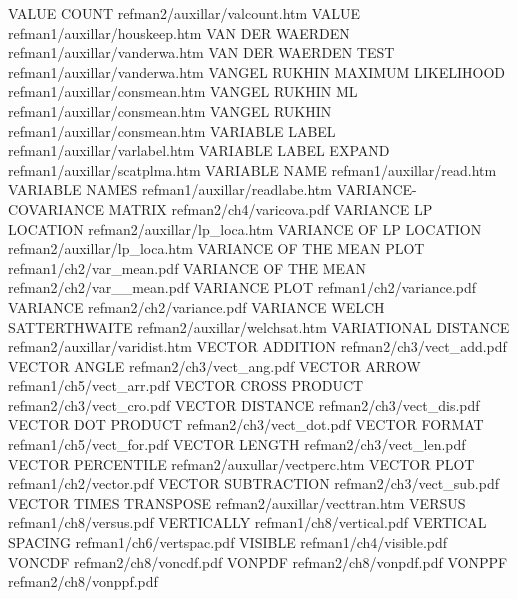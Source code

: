 VALUE COUNT                             refman2/auxillar/valcount.htm
VALUE                                   refman1/auxillar/houskeep.htm
VAN DER WAERDEN                         refman1/auxillar/vanderwa.htm
VAN DER WAERDEN TEST                    refman1/auxillar/vanderwa.htm
VANGEL RUKHIN MAXIMUM LIKELIHOOD        refman1/auxillar/consmean.htm
VANGEL RUKHIN ML                        refman1/auxillar/consmean.htm
VANGEL RUKHIN                           refman1/auxillar/consmean.htm
VARIABLE LABEL                          refman1/auxillar/varlabel.htm
VARIABLE LABEL EXPAND                   refman1/auxillar/scatplma.htm
VARIABLE NAME                           refman1/auxillar/read.htm
VARIABLE NAMES                          refman1/auxillar/readlabe.htm
VARIANCE-COVARIANCE MATRIX              refman2/ch4/varicova.pdf
VARIANCE LP LOCATION                    refman2/auxillar/lp_loca.htm
VARIANCE OF LP LOCATION                 refman2/auxillar/lp_loca.htm
VARIANCE OF THE MEAN PLOT               refman1/ch2/var_mean.pdf
VARIANCE OF THE MEAN                    refman2/ch2/var__mean.pdf
VARIANCE PLOT                           refman1/ch2/variance.pdf
VARIANCE                                refman2/ch2/variance.pdf
VARIANCE WELCH SATTERTHWAITE            refman2/auxillar/welchsat.htm
VARIATIONAL DISTANCE                    refman2/auxillar/varidist.htm
VECTOR ADDITION                         refman2/ch3/vect_add.pdf
VECTOR ANGLE                            refman2/ch3/vect_ang.pdf
VECTOR ARROW                            refman1/ch5/vect_arr.pdf
VECTOR CROSS PRODUCT                    refman2/ch3/vect_cro.pdf
VECTOR DISTANCE                         refman2/ch3/vect_dis.pdf
VECTOR DOT PRODUCT                      refman2/ch3/vect_dot.pdf
VECTOR FORMAT                           refman1/ch5/vect_for.pdf
VECTOR LENGTH                           refman2/ch3/vect_len.pdf
VECTOR PERCENTILE                       refman2/auxullar/vectperc.htm
VECTOR PLOT                             refman1/ch2/vector.pdf
VECTOR SUBTRACTION                      refman2/ch3/vect_sub.pdf
VECTOR TIMES TRANSPOSE                  refman2/auxillar/vecttran.htm
VERSUS                                  refman1/ch8/versus.pdf
VERTICALLY                              refman1/ch8/vertical.pdf
VERTICAL SPACING                        refman1/ch6/vertspac.pdf
VISIBLE                                 refman1/ch4/visible.pdf
VONCDF                                  refman2/ch8/voncdf.pdf
VONPDF                                  refman2/ch8/vonpdf.pdf
VONPPF                                  refman2/ch8/vonppf.pdf
